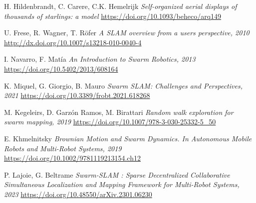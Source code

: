 \documentclass[12pt]{article}
\begin{document}
\begin{thebibliography}{9}

    H. Hildenbrandt, C. Carere, C.K. Hemelrijk
    \textit{Self-organized aerial displays of thousands of starlings: a model}
    \href{https://doi.org/10.1093/beheco/arq149}{https://doi.org/10.1093/beheco/arq149}

    U. Frese, R. Wagner, T. Röfer
    \textit{A SLAM overview from a users perspective, 2010}
    \href{http://dx.doi.org/10.1007/s13218-010-0040-4}{http://dx.doi.org/10.1007/s13218-010-0040-4}

    I. Navarro, F. Matía
    \textit{An Introduction to Swarm Robotics, 2013}
    \href{https://doi.org/10.5402/2013/608164}{https://doi.org/10.5402/2013/608164}

    K. Miquel, G. Giorgio, B. Mauro
    \textit{Swarm SLAM: Challenges and Perspectives, 2021}
    \href{https://doi.org/10.3389/frobt.2021.618268}{https://doi.org/10.3389/frobt.2021.618268}

    M. Kegeleirs, D. Garzón Ramos,  M. Birattari
    \textit{Random walk exploration for swarm mapping, 2019}
    \href{https://doi.org/10.1007/978-3-030-25332-5_50}{https://doi.org/10.1007/978-3-030-25332-5_50}

    E. Khmelnitsky
    \textit{Brownian Motion and Swarm Dynamics. In Autonomous Mobile Robots and Multi-Robot Systems, 2019}
    \href{https://doi.org/10.1002/9781119213154.ch12}{https://doi.org/10.1002/9781119213154.ch12}

    P. Lajoie, G. Beltrame
    \textit{Swarm-SLAM : Sparse Decentralized Collaborative Simultaneous Localization and Mapping Framework for Multi-Robot Systems, 2023}
    \href{https://doi.org/10.48550/arXiv.2301.06230}{https://doi.org/10.48550/arXiv.2301.06230}

\end{thebibliography}
\end{document}
